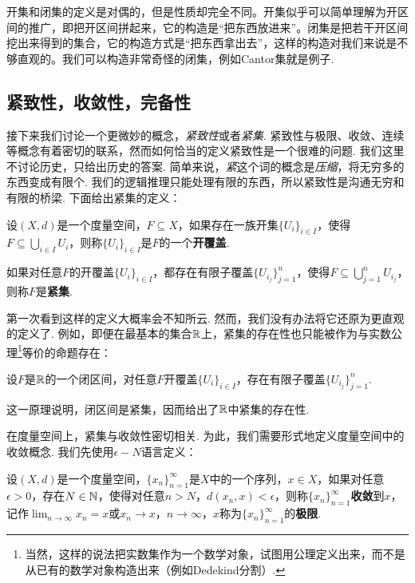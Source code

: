 开集和闭集的定义是对偶的，但是性质却完全不同。开集似乎可以简单理解为开区间的推广，即把开区间拼起来，它的构造是“把东西放进来”。闭集是把若干开区间挖出来得到的集合，它的构造方式是“把东西拿出去”，这样的构造对我们来说是不够直观的。我们可以构造非常奇怪的闭集，例如Cantor集就是例子. 

\subsection{紧致性，收敛性，完备性}

接下来我们讨论一个更微妙的概念，\emph{紧致性}或者\emph{紧集}. 紧致性与极限、收敛、连续等概念有着密切的联系，然而如何恰当的定义紧致性是一个很难的问题. 我们这里不讨论历史，只给出历史的答案. 简单来说，\emph{紧}这个词的概念是\emph{压缩}，将无穷多的东西变成有限个. 我们的逻辑推理只能处理有限的东西，所以紧致性是沟通无穷和有限的桥梁. 下面给出紧集的定义：

\begin{definition}[开覆盖，紧集]
    设$(X,d)$是一个度量空间，$F\subseteq X$，如果存在一族开集$\{U_i\}_{i\in I}$，使得$F\subseteq \bigcup_{i\in I}U_i$，则称$\{U_i\}_{i\in I}$是$F$的一个\textbf{开覆盖}. 
    
    如果对任意$F$的开覆盖$\{U_i\}_{i\in I}$，都存在有限子覆盖$\{U_{i_j}\}_{j=1}^n$，使得$F\subseteq \bigcup_{j=1}^nU_{i_j}$，则称$F$是\textbf{紧集}. 
\end{definition}

第一次看到这样的定义大概率会不知所云. 然而，我们没有办法将它还原为更直观的定义了. 例如，即便在最基本的集合$\mathbb{R}$上，紧集的存在性也只能被作为与实数公理\footnote{当然，这样的说法把实数集作为一个数学对象，试图用公理定义出来，而不是从已有的数学对象构造出来（例如Dedekind分割）. }等价的命题存在：

\begin{proposition}\label{prop:heine-borel}
设$F$是$\mathbb{R}$的一个闭区间，对任意$F$开覆盖$\{U_i\}_{i\in I}$，存在有限子覆盖$\{U_{i_j}\}_{j=1}^n$.
\end{proposition}

这一原理说明，闭区间是紧集，因而给出了$\mathbb{R}$中紧集的存在性. 

在度量空间上，紧集与收敛性密切相关. 为此，我们需要形式地定义度量空间中的收敛概念. 我们先使用$\epsilon-N$语言定义：

\begin{definition}[收敛，极限]
    设$(X,d)$是一个度量空间，$\{x_n\}_{n=1}^\infty$是$X$中的一个序列，$x\in X$，如果对任意$\epsilon>0$，存在$N\in\mathbb{N}$，使得对任意$n>N$，$d(x_n,x)<\epsilon$，则称$\{x_n\}_{n=1}^\infty$\textbf{收敛}到$x$，记作$\lim_{n\to\infty}x_n=x$或$x_n\to x$，$n\to\infty$，$x$称为$\{x_n\}_{n=1}^\infty$的\textbf{极限}. 
\end{definition}

